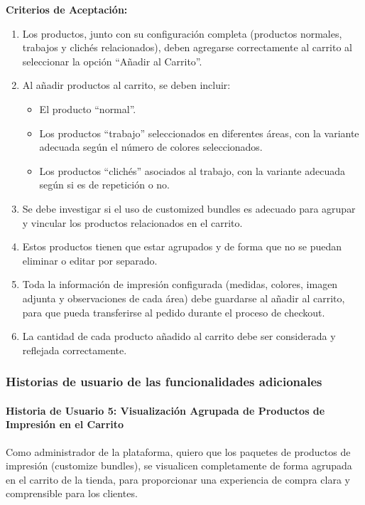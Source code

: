 \documentclass[12pt]{article}
\newcommand{\subsubsubsection}[1]{\paragraph{#1}}
\begin{document}
\vspace{0.5cm}
\textbf{Criterios de Aceptación:}
\begin{enumerate}[label=\arabic*.]
    \item Los productos, junto con su configuración completa (productos normales, trabajos y clichés relacionados), deben agregarse correctamente al carrito al seleccionar la opción ``Añadir al Carrito''.
    \item Al añadir productos al carrito, se deben incluir:
          \begin{itemize}
              \item El producto ``normal''.
              \item Los productos ``trabajo'' seleccionados en diferentes áreas, con la variante adecuada según el número de colores seleccionados.
              \item Los productos ``clichés'' asociados al trabajo, con la variante adecuada según si es de repetición o no.
          \end{itemize}
    \item Se debe investigar si el uso de customized bundles es adecuado para agrupar y vincular los productos relacionados en el carrito.
    \item Estos productos tienen que estar agrupados y de forma que no se puedan eliminar o editar por separado.
    \item Toda la información de impresión configurada (medidas, colores, imagen adjunta y observaciones de cada área) debe guardarse al añadir al carrito, para que pueda transferirse al pedido durante el proceso de checkout.
    \item La cantidad de cada producto añadido al carrito debe ser considerada y reflejada correctamente.
\end{enumerate}

\subsubsection{Historias de usuario de las funcionalidades adicionales}

\subsubsubsection{Historia de Usuario 5: Visualización Agrupada de Productos de Impresión en el Carrito}\label{sec:historia5}

Como administrador de la plataforma,
quiero que los paquetes de productos de impresión (customize bundles), se visualicen completamente de forma agrupada en el carrito de la tienda,
para proporcionar una experiencia de compra clara y comprensible para los clientes.
\end{document}
